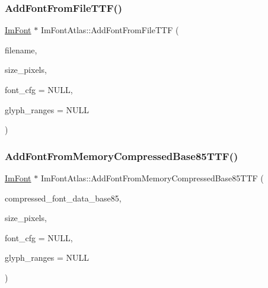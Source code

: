 \mbox{\label{struct_im_font_atlas_a26d0333bae95222ca2c2fd2886eae562}} 
\subsubsection{\texorpdfstring{Add\+Font\+From\+File\+T\+T\+F()}{AddFontFromFileTTF()}}
{\footnotesize\ttfamily \mbox{\hyperlink{struct_im_font}{Im\+Font}} $\ast$ Im\+Font\+Atlas\+::\+Add\+Font\+From\+File\+T\+TF (\begin{DoxyParamCaption}\item[{const char $\ast$}]{filename,  }\item[{float}]{size\+\_\+pixels,  }\item[{const \mbox{\hyperlink{struct_im_font_config}{Im\+Font\+Config}} $\ast$}]{font\+\_\+cfg = {\ttfamily NULL},  }\item[{const \mbox{\hyperlink{imgui_8h_af2c7badaf05a0008e15ef76d40875e97}{Im\+Wchar}} $\ast$}]{glyph\+\_\+ranges = {\ttfamily NULL} }\end{DoxyParamCaption})}

\mbox{\label{struct_im_font_atlas_ab43b930beb57c0b998f42f4586677956}} 
\subsubsection{\texorpdfstring{Add\+Font\+From\+Memory\+Compressed\+Base85\+T\+T\+F()}{AddFontFromMemoryCompressedBase85TTF()}}
{\footnotesize\ttfamily \mbox{\hyperlink{struct_im_font}{Im\+Font}} $\ast$ Im\+Font\+Atlas\+::\+Add\+Font\+From\+Memory\+Compressed\+Base85\+T\+TF (\begin{DoxyParamCaption}\item[{const char $\ast$}]{compressed\+\_\+font\+\_\+data\+\_\+base85,  }\item[{float}]{size\+\_\+pixels,  }\item[{const \mbox{\hyperlink{struct_im_font_config}{Im\+Font\+Config}} $\ast$}]{font\+\_\+cfg = {\ttfamily NULL},  }\item[{const \mbox{\hyperlink{imgui_8h_af2c7badaf05a0008e15ef76d40875e97}{Im\+Wchar}} $\ast$}]{glyph\+\_\+ranges = {\ttfamily NULL} }\end{DoxyParamCaption})}

